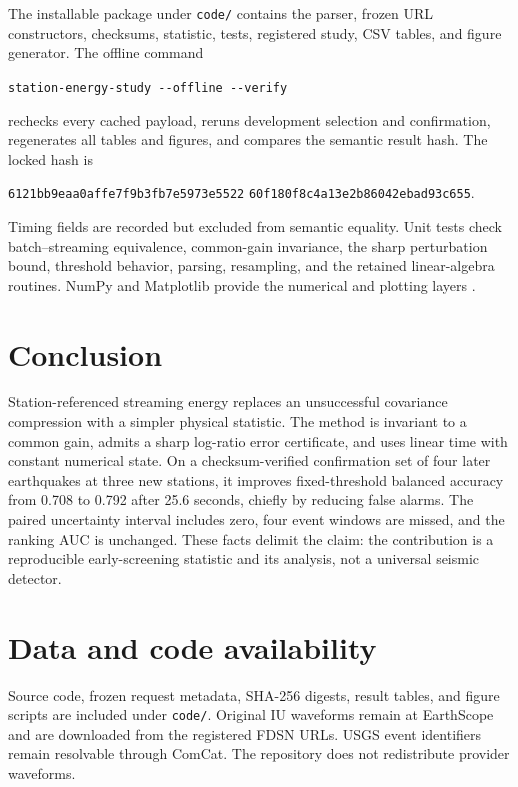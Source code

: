 \documentclass[10pt,letterpaper,twoside]{article}
\begin{document}
The installable package under \texttt{code/} contains the parser, frozen URL
constructors, checksums, statistic, tests, registered study, CSV tables, and
figure generator.  The offline command
\begin{center}
\small
\texttt{station-energy-study -{}-offline -{}-verify}
\end{center}
rechecks every cached payload, reruns development selection and confirmation,
regenerates all tables and figures, and compares the semantic result hash.
The locked hash is
\begin{center}
\small
\texttt{6121bb9eaa0affe7f9b3fb7e5973e5522}\allowbreak
\texttt{60f180f8c4a13e2b86042ebad93c655}.
\end{center}
Timing fields are recorded but excluded from semantic equality.  Unit tests
check batch--streaming equivalence, common-gain invariance, the sharp
perturbation bound, threshold behavior, parsing, resampling, and the retained
linear-algebra routines.  NumPy and Matplotlib provide the numerical and
plotting layers \cite{harris2020numpy,hunter2007matplotlib}.

\section{Conclusion}

Station-referenced streaming energy replaces an unsuccessful covariance
compression with a simpler physical statistic.  The method is invariant to a
common gain, admits a sharp log-ratio error certificate, and uses linear time
with constant numerical state.  On a checksum-verified confirmation set of
four later earthquakes at three new stations, it improves fixed-threshold
balanced accuracy from 0.708 to 0.792 after 25.6 seconds, chiefly by reducing
false alarms.  The paired uncertainty interval includes zero, four event
windows are missed, and the ranking AUC is unchanged.  These facts delimit the
claim: the contribution is a reproducible early-screening statistic and its
analysis, not a universal seismic detector.

\section*{Data and code availability}

Source code, frozen request metadata, SHA-256 digests, result tables, and
figure scripts are included under \texttt{code/}.  Original IU waveforms
remain at EarthScope and are downloaded from the registered FDSN URLs.  USGS
event identifiers remain resolvable through ComCat.  The repository does not
redistribute provider waveforms.

\begingroup
\small


\endgroup
\end{document}
